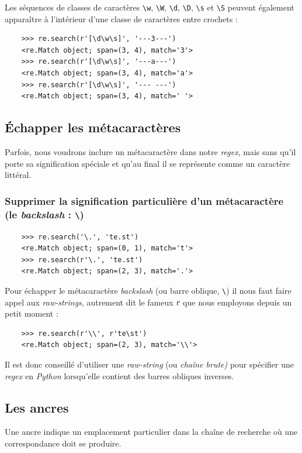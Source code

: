 \documentclass[a4paper,12pt]{book}
\begin{document}
Les séquences de classes de caractères \texttt{\textbackslash{}w}, \texttt{\textbackslash{}W}, \texttt{\textbackslash{}d}, \texttt{\textbackslash{}D}, \texttt{\textbackslash{}s} et \texttt{\textbackslash{}S} peuvent également apparaître à l'intérieur d'une classe de caractères entre crochets :
\begin{verbatim}
    >>> re.search(r'[\d\w\s]', '---3---')
    <re.Match object; span=(3, 4), match='3'>
    >>> re.search(r'[\d\w\s]', '---a---')
    <re.Match object; span=(3, 4), match='a'>
    >>> re.search(r'[\d\w\s]', '--- ---')
    <re.Match object; span=(3, 4), match=' '>
\end{verbatim}
\medskip

\subsection*{Échapper les métacaractères}
Parfois, nous voudrons inclure un métacaractère dans notre \textit{regex}, mais sans qu'il porte sa signification spéciale et qu'au final il se représente comme un caractère littéral.
\medskip

\subsubsection*{Supprimer la signification particulière d'un métacaractère (le \textit{backslash} : \texttt{\textbackslash})}
\begin{verbatim}
    >>> re.search('\.', 'te.st')
    <re.Match object; span=(0, 1), match='t'>
    >>> re.search(r'\.', 'te.st')
    <re.Match object; span=(2, 3), match='.'>
\end{verbatim}
\medskip

Pour échapper le métacaractère \textit{backslash} (ou barre oblique, \texttt{\textbackslash}) il nous faut faire appel aux \textit{raw-strings}, autrement dit le fameux \texttt{r} que nous employons depuis un petit moment :
\begin{verbatim}
    >>> re.search(r'\\', r'te\st')
    <re.Match object; span=(2, 3), match='\\'>
\end{verbatim}
\medskip

Il est donc conseillé d'utiliser une \textit{raw-string} (ou \textit{chaîne brute)} pour spécifier une \textit{regex} en \textit{Python} lorsqu'elle contient des barres obliques inverses.
\medskip

\subsection*{Les ancres}
Une ancre indique un emplacement particulier dans la chaîne de recherche où une correspondance doit se produire.
\medskip
\end{document}
